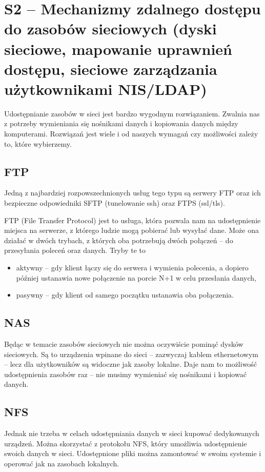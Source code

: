 \section{S2 -- Mechanizmy zdalnego dostępu do zasobów sieciowych (dyski sieciowe, mapowanie uprawnień dostępu, sieciowe zarządzania użytkownikami NIS/LDAP)}

Udostępnianie zasobów w sieci jest bardzo wygodnym rozwiązaniem.
Zwalnia nas z potrzeby wymieniania się nośnikami danych i kopiowania danych między komputerami.
Rozwiązań jest wiele i od naszych wymagań czy możliwości zależy to, które wybierzemy.

\subsection{FTP}
Jedną z najbardziej rozpowszechnionych usług tego typu są serwery FTP oraz ich bezpieczne odpowiedniki SFTP (tunelowanie ssh) oraz FTPS (ssl/tls).

FTP (File Transfer Protocol) jest to usługa, która pozwala nam na udostępnienie miejsca na serwerze, z którego ludzie mogą pobierać lub wysyłać dane.
Może ona działać w dwóch trybach, z których oba potrzebują dwóch połączeń -- do przesyłania poleceń oraz danych.
Tryby te to
\begin{itemize}
	\item{aktywny -- gdy klient łączy się do serwera i wymienia polecenia, a dopiero później ustanawia nowe połączenie na porcie N+1 w celu przesłania danych,}
	\item{pasywny -- gdy klient od samego początku ustanawia oba połączenia.}
\end{itemize}

\subsection{NAS}
Będąc w temacie zasobów sieciowych nie można oczywiście pominąć dysków sieciowych.
Są to urządzenia wpinane do sieci -- zazwyczaj kablem ethernetowym -- lecz dla użytkowników są widoczne jak zasoby lokalne.
Daje nam to możliwość udostępnienia zasobów raz -- nie musimy wymieniać się nośnikami i kopiować danych.

\subsection{NFS}
Jednak nie trzeba w celach udostępniania danych w sieci kupować dedykowanych urządzeń. 
Można skorzystać z protokołu NFS, który umożliwia udostępnienie swoich danych w sieci.
Udostępnione pliki można zamontować w swoim systemie i operować jak na zasobach lokalnych.

